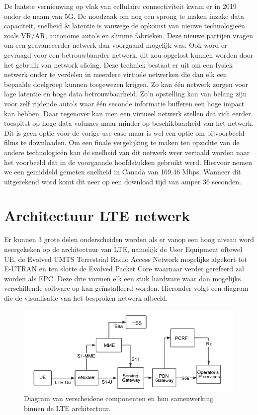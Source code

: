 De laatste vernieuwing op vlak van cellulaire connectiviteit kwam er in 2019 onder de naam van 5G. De noodzaak om nog een sprong te maken inzake data capaciteit, snelheid \& latentie is vanwege de opkomst van nieuwe technologieën zoals VR/AR, autonome auto's en slimme fabrieken. Deze nieuwe partijen vragen om een geavanceerder netwerk dan voorgaand mogelijk was. Ook word er gevraagd voor een betrouwbaarder netwerk, dit zou opgelost kunnen worden door het gebruik van network slicing. Deze techniek bestaat er uit om een fysiek netwerk onder te verdelen in meerdere virtuele netwerken die dan elk een bepaalde doelgroep kunnen toegewezen krijgen. Zo kan één netwerk zorgen voor lage latentie en hoge data betrouwbaarheid. Zo'n opstelling kan van belang zijn voor zelf rijdende auto's waar één seconde informatie bufferen een hoge impact kan hebben. Daar tegenover kan men een virtueel netwerk stellen dat zich eerder toespitst op hoge data volumes maar minder op beschikbaarheid van het netwerk. Dit is geen optie voor de vorige use case maar is wel een optie om bijvoorbeeld films te downloaden. \autocite{Flinders2024} Om een finale vergelijking te maken ten opzichte van de andere technologieën kan de snelheid van dit netwerk weer vertaald worden naar het voorbeeld dat in de voorgaande hoofdstukken gebruikt werd. Hiervoor nemen we een gemiddeld gemeten snelheid in Canada van 169.46 Mbps. \autocite{Galazzo2020} Wanneer dit uitgerekend word komt dit neer op een download tijd van amper 36 seconden. \autocite{Wooding2024}

\section{Architectuur LTE netwerk}
Er kunnen 3 grote delen onderscheiden worden als er vanop een hoog niveau word neergekeken op de architectuur van LTE, namelijk de User Equipment oftewel UE, de Evolved UMTS Terrestrial Radio Access Network mogelijks afgekort tot E-UTRAN en ten slotte de Evolved Packet Core waarnaar verder gerefeerd zal worden als EPC. Deze drie vormen elk een stuk hardware waar dan mogelijks verschillende software op kan geïnstalleerd worden. \autocite{Richard2021} Hieronder volgt een diagram die de visualisatie van het besproken netwerk afbeeld. 
\begin{figure}[!htb]
    \includegraphics[width=1\linewidth]{graphics/LTE_architecture}
    \caption[Overzicht van de verscheidene componenten van de LTE architectuur.]{Diagram van verscheidene componenten en hun samenwerking binnen de LTE architectuur. \autocite{Yunman2021}}
    \label{fig:ltearchitecture}
\end{figure}

